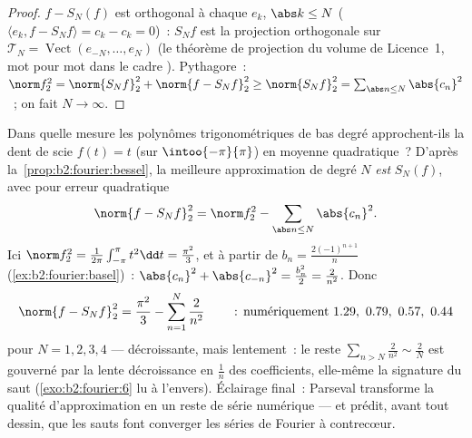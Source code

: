 \begin{proof}
$f - S_N(f)$ est orthogonal à chaque $e_k$, $\abs k \leq N$ ($\langle
e_k, f - S_N f\rangle = c_k - c_k = 0$)~: $S_Nf$ est la projection
orthogonale sur $\mathcal{T}_N = \operatorname{Vect}(e_{-N}, \dots,
e_N)$ (le théorème de projection du volume de Licence~1, mot pour mot
dans le cadre ). Pythagore~: $\norm f_2^2 = \norm{S_Nf}_2^2 +
\norm{f - S_Nf}_2^2 \geq \norm{S_Nf}_2^2 = \sum_{\abs n \leq N}
\abs{c_n}^2$~; on fait $N \to \infty$.
\end{proof}

\begin{example}\label{ex:b2:fourier:bestapprox}
Dans quelle mesure les polynômes trigonométriques de bas degré
approchent-ils la dent de scie $f(t) = t$ (sur $\intoo{-\pi}{\pi}$)
en moyenne quadratique~? D'après la~\cref{prop:b2:fourier:bessel}, la
meilleure approximation de degré $N$ \emph{est} $S_N(f)$, avec pour
erreur quadratique
\[
\norm{f - S_Nf}_2^2 = \norm f_2^2 -
\sum_{\abs n\leq N}\abs{c_n}^2 .
\]
Ici $\norm f_2^2 = \frac{1}{2\pi}\int_{-\pi}^\pi t^2\dd t =
\frac{\pi^2}{3}$, et à partir de $b_n = \frac{2(-1)^{n+1}}{n}$
(\cref{ex:b2:fourier:basel})~: $\abs{c_n}^2 + \abs{c_{-n}}^2 =
\frac{b_n^2}{2} = \frac{2}{n^2}$. Donc
\[
\norm{f - S_Nf}_2^2
= \frac{\pi^2}{3} - \sum_{n=1}^{N}\frac{2}{n^2}
\qquad\text{~: numériquement } 1.29,\ 0.79,\ 0.57,\ 0.44
\]
pour $N = 1, 2, 3, 4$ --- décroissante, mais lentement~: le reste
$\sum_{n>N}\frac2{n^2} \sim \frac2N$ est gouverné par la lente
décroissance en $\frac1n$ des coefficients, elle-même la signature
du saut (\cref{exo:b2:fourier:6} lu à l'envers). Éclairage final~:
Parseval transforme la qualité d'approximation en un reste de série
numérique --- et prédit, avant tout dessin, que les sauts font
converger les séries de Fourier à contrecœur.
\end{example}

